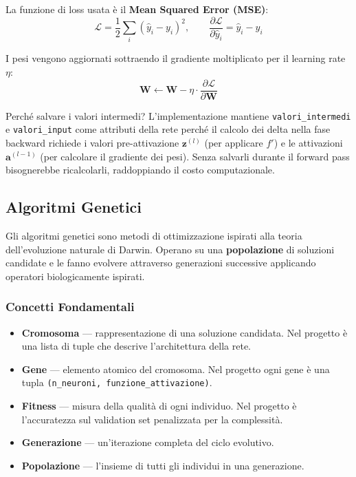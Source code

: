 \documentclass[12pt, a4paper]{article}
\begin{document}
\vspace{0.2cm}
La funzione di loss usata è il \textbf{Mean Squared Error (MSE)}:
\begin{equation}
    \mathcal{L} = \frac{1}{2}\sum_i \left(\hat{y}_i - y_i\right)^2,
    \qquad
    \frac{\partial \mathcal{L}}{\partial \hat{y}_i} = \hat{y}_i - y_i
\end{equation}

I pesi vengono aggiornati sottraendo il gradiente moltiplicato per il
learning rate $\eta$:
\begin{equation}
    \mathbf{W} \leftarrow \mathbf{W} - \eta \cdot \frac{\partial \mathcal{L}}{\partial \mathbf{W}}
\end{equation}

\begin{concetto}{Perché salvare i valori intermedi?}
L'implementazione mantiene \texttt{valori\_intermedi} e \texttt{valori\_input}
come attributi della rete perché il calcolo dei delta nella fase backward
richiede i valori pre-attivazione $\mathbf{z}^{(l)}$ (per applicare $f'$) e
le attivazioni $\mathbf{a}^{(l-1)}$ (per calcolare il gradiente dei pesi).
Senza salvarli durante il forward pass bisognerebbe ricalcolarli, raddoppiando
il costo computazionale.
\end{concetto}

\subsection{Algoritmi Genetici}

Gli algoritmi genetici sono metodi di ottimizzazione ispirati alla teoria
dell'evoluzione naturale di Darwin. Operano su una \textbf{popolazione} di
soluzioni candidate e le fanno evolvere attraverso generazioni successive
applicando operatori biologicamente ispirati.

\subsubsection{Concetti Fondamentali}

\begin{itemize}
    \item \textbf{Cromosoma} --- rappresentazione di una soluzione candidata.
          Nel progetto è una lista di tuple che descrive l'architettura della rete.
    \item \textbf{Gene} --- elemento atomico del cromosoma. Nel progetto ogni
          gene è una tupla \texttt{(n\_neuroni, funzione\_attivazione)}.
    \item \textbf{Fitness} --- misura della qualità di ogni individuo.
          Nel progetto è l'accuratezza sul validation set penalizzata per la complessità.
    \item \textbf{Generazione} --- un'iterazione completa del ciclo evolutivo.
    \item \textbf{Popolazione} --- l'insieme di tutti gli individui in una generazione.
\end{itemize}
\end{document}
